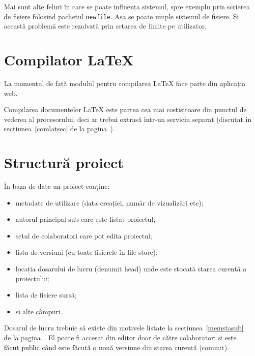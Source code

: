 \documentclass[a4wide,12pt]{report}
\newcommand{\eng}[1]{{#1}} %
\newcommand{\cod}[1]{\texttt{#1}}
\begin{document}
Mai sunt alte feluri în care se poate influența sistemul, spre exemplu prin
scrierea de fișiere folosind pachetul \cod{newfile}. Așa se poate umple sistemul
de fișiere. Și această problemă este rezolvată prin setarea de limite pe
utilizator.

\section{Compilator \LaTeX}

La momentul de față modulul pentru compilarea \LaTeX{} face parte din aplicația
web.

Compilarea documentelor \LaTeX{} este partea cea mai costisitoare din punctul de
vederea al procesorului, deci ar trebui extrasă într-un serviciu separat
(discutat în secțiunea~\ref{comlatsec} de la pagina~\pageref{comlatsec}).

\section{Structură proiect}

În baza de date un proiect conține:

\begin{itemize}

\item metadate de utilizare (data creației, număr de vizualizări etc);

\item autorul principal sub care este listat proiectul;

\item setul de colaboratori care pot edita proiectul;

\item lista de versiuni (cu toate fișierele în \eng{file store});

\item locația dosarului de lucru (denumit \eng{head}) unde este stocată starea
curentă a proiectului;

\item lista de fișiere sursă;

\item și alte câmpuri.

\end{itemize}

Dosarul de lucru trebuie să existe din motivele listate la
secțiunea~\ref{memstasub} de la pagina~\pageref{memstasub}. El poate fi accesat
din editor doar de către colaboratori și este făcut public când este făcută o
nouă versiune din starea curentă (\eng{commit}).
\end{document}

